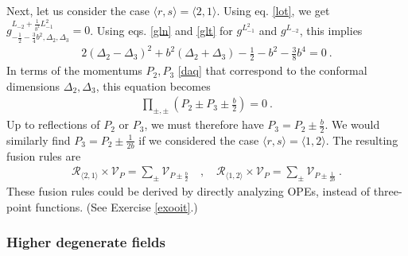 \documentclass[12pt, a4paper, notitlepage, twoside]{report}
\numberwithin{equation}{section}
\theoremstyle{break}
\begin{document}
Next, let us consider the case $\langle r,s \rangle = \langle 2,1 \rangle$.
Using eq. \eqref{lot}, we get
$g^{L_{-2} +\frac{1}{b^2} L_{-1}^2 }_{-\frac12 -\frac34 b^2,\Delta_2,\Delta_3} = 0$.
Using eqs. \eqref{gln} and \eqref{glt} for $g^{L_{-1}^2}$ and $g^{L_{-2}}$, this implies
\begin{align}
 2(\Delta_2-\Delta_3)^2 + b^2 (\Delta_2+\Delta_3) - \frac12 - b^2 -\frac38 b^4= 0\ .
\end{align}
In terms of the momentums $P_2,P_3$ \eqref{daq} that correspond to the conformal dimensions $\Delta_2,\Delta_3$, this equation becomes
\begin{align}
\prod_{\pm,\pm} \left(P_2\pm P_3 \pm \frac{b}{2}\right) = 0 \ .
\end{align}
Up to reflections of $P_2$ or $P_3$, we must therefore have
$
 P_3 = P_2 \pm \frac{b}{2}
$.
We would similarly find $P_3 = P_2 \pm \frac{1}{2b}$ if we considered the case $\langle r,s\rangle = \langle 1,2\rangle$. 
The resulting fusion rules are 
\begin{align}
\boxed{ \mathcal{R}_{\langle 2,1 \rangle}\times \mathcal{V}_P = \sum_\pm \mathcal{V}_{P \pm \frac{b}{2}} }\quad , \quad 
\boxed{ \mathcal{R}_{\langle 1,2 \rangle}\times \mathcal{V}_P = \sum_\pm \mathcal{V}_{P \pm \frac{1}{2b}} }\ .
\label{rot}
\end{align}
These fusion rules could be derived by directly analyzing OPEs, instead of three-point functions. (See Exercise \ref{exooit}.) 

\subsubsection{Higher degenerate fields}
\end{document}
